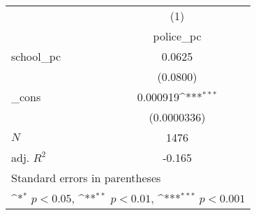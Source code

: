 {
\def\sym#1{\ifmmode^{#1}\else\(^{#1}\)\fi}
\begin{tabular}{l*{1}{c}}
\hline\hline
            &\multicolumn{1}{c}{(1)}\\
            &\multicolumn{1}{c}{police\_pc}\\
\hline
school\_pc   &      0.0625         \\
            &    (0.0800)         \\
[1em]
\_cons      &    0.000919\sym{***}\\
            & (0.0000336)         \\
\hline
\(N\)       &        1476         \\
adj. \(R^{2}\)&      -0.165         \\
\hline\hline
\multicolumn{2}{l}{\footnotesize Standard errors in parentheses}\\
\multicolumn{2}{l}{\footnotesize \sym{*} \(p<0.05\), \sym{**} \(p<0.01\), \sym{***} \(p<0.001\)}\\
\end{tabular}
}
